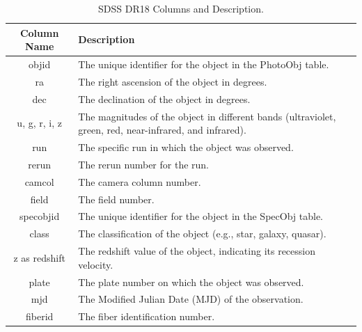 \begin{table}[H]
\begin{center}
\caption{SDSS DR18 Columns and Description.}
\label{tab:column_description}
\begin{tabular}{|c|p{10cm}|}
\hline
\textbf{Column Name} & \textbf{Description} \\
\hline
objid & The unique identifier for the object in the PhotoObj table. \\
\hline
ra & The right ascension of the object in degrees. \\
\hline
dec & The declination of the object in degrees. \\
\hline
u, g, r, i, z & The magnitudes of the object in different bands (ultraviolet, green, red, near-infrared, and infrared). \\
\hline
run & The specific run in which the object was observed. \\
\hline
rerun & The rerun number for the run. \\
\hline
camcol & The camera column number. \\
\hline
field & The field number. \\
\hline
specobjid & The unique identifier for the object in the SpecObj table. \\
\hline
class & The classification of the object (e.g., star, galaxy, quasar). \\
\hline
z as redshift & The redshift value of the object, indicating its recession velocity. \\
\hline
plate & The plate number on which the object was observed. \\
\hline
mjd & The Modified Julian Date (MJD) of the observation. \\
\hline
fiberid & The fiber identification number. \\
\hline
\end{tabular}
\end{center}
\end{table}


